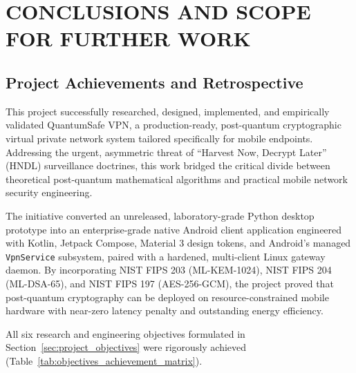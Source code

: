 
\chapter{CONCLUSIONS AND SCOPE FOR FURTHER WORK}
\label{chap:conclusion}

\section{Project Achievements and Retrospective}
\label{sec:project_summary}
\label{sec:objectives_assessment}

This project successfully researched, designed, implemented, and empirically validated QuantumSafe VPN, a production-ready, post-quantum cryptographic virtual private network system tailored specifically for mobile endpoints. Addressing the urgent, asymmetric threat of ``Harvest Now, Decrypt Later'' (HNDL) surveillance doctrines, this work bridged the critical divide between theoretical post-quantum mathematical algorithms and practical mobile network security engineering.

The initiative converted an unreleased, laboratory-grade Python desktop prototype into an enterprise-grade native Android client application engineered with Kotlin, Jetpack Compose, Material 3 design tokens, and Android's managed \texttt{VpnService} subsystem, paired with a hardened, multi-client Linux gateway daemon. By incorporating NIST FIPS 203 (ML-KEM-1024), NIST FIPS 204 (ML-DSA-65), and NIST FIPS 197 (AES-256-GCM), the project proved that post-quantum cryptography can be deployed on resource-constrained mobile hardware with near-zero latency penalty and outstanding energy efficiency.

All six research and engineering objectives formulated in Section~\ref{sec:project_objectives} were rigorously achieved (Table~\ref{tab:objectives_achievement_matrix}).

